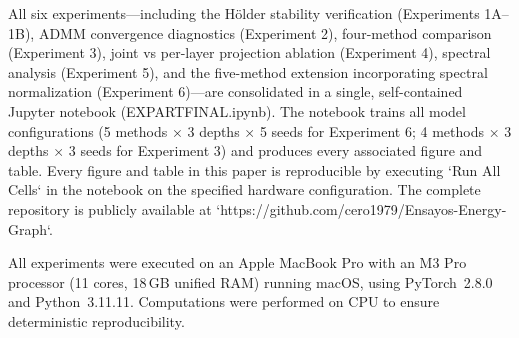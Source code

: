 \documentclass[a4paper,fleqn]{cas-sc}
\theoremstyle{remark}
\theoremstyle{definition}
\begin{document}
All six experiments—including the Hölder stability verification (Experiments 1A–1B), ADMM convergence diagnostics (Experiment 2), four-method comparison (Experiment 3), joint vs per-layer projection ablation (Experiment 4), spectral analysis (Experiment 5), and the five-method extension incorporating spectral normalization (Experiment 6)—are consolidated in a single, self-contained Jupyter notebook (EXPARTFINAL.ipynb). The notebook trains all model configurations (5 methods × 3 depths × 5 seeds for Experiment 6; 4 methods × 3 depths × 3 seeds for Experiment 3) and produces every associated figure and table. Every figure and table in this paper is reproducible by executing `Run All Cells` in the notebook on the specified hardware configuration. The complete repository is publicly available at `https://github.com/cero1979/Ensayos-Energy-Graph`.

All experiments were executed on an Apple MacBook Pro with an M3 Pro processor (11 cores, 18\,GB unified RAM) running macOS, using PyTorch~2.8.0 and Python~3.11.11. Computations were performed on CPU to ensure deterministic reproducibility.



\end{document}
